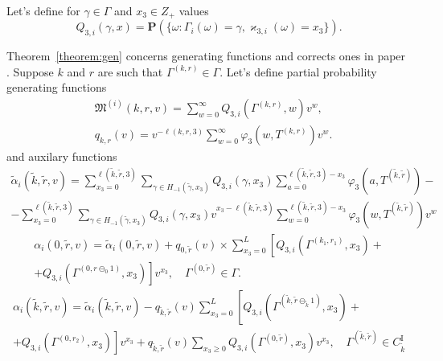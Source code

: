 \documentclass[60x84/16,10pt]{dccn}
\begin{document}
{Let's define for $\gamma \in \Gamma$ and $x_3 \in Z_+$ values
\begin{equation*}
Q_{3,i}(\gamma,x) = {\mathbf P}(\{\omega\colon \Gamma_{i}(\omega)=\gamma, \varkappa_{3,i}(\omega)=x_3\}).
\end{equation*}

Theorem~\ref{theorem:gen} concerns generating functions and corrects ones in paper \cite{k:z:2016}. Suppose $k$ and $r$ are such that $\Gamma^{(k,r)}\in \Gamma$. Let's define  partial probability generating functions 
\begin{align*}
&\mathfrak{M}^{(i)}(k,r,v) = \sum_{w=0}^{\infty} Q_{3,i}(\Gamma^{(k,r)},w) v^w,\\
&q_{k,r}(v) = v^{-\ell(k,r,3)}\sum_{w=0}^{\infty} \varphi_3(w,T^{(k,r)})v^w.
\end{align*}
and auxilary functions
\begin{multline*}
\tilde{\alpha}_i(\tilde{k},\tilde{r},v) = \sum_{x_3=0}^{\ell(\tilde{k},\tilde{r},3)}\sum_{\gamma \in H_{-1}(\tilde{\gamma},x_3)} Q_{3,i}(\gamma,x_3) \sum_{a=0}^{\ell(\tilde{k},\tilde{r},3) - x_3} \varphi_3(a,T^{(\tilde{k},\tilde{r})}) - \\
- \sum_{x_3=0}^{\ell(\tilde{k},\tilde{r},3)}  \sum_{\gamma \in H_{-1}(\tilde{\gamma},x_3)} Q_{3,i}(\gamma,x_3) v^{x_3-\ell(\tilde{k},\tilde{r},3)}  \sum_{w=0}^{\ell(\tilde{k},\tilde{r},3) -x_3}
\varphi_3(w,T^{(\tilde{k},\tilde{r})}) v^w
\end{multline*}
\begin{multline*}
\alpha_i(0,\tilde{r},v) =\tilde{\alpha}_i(0,\tilde{r},v) + q_{0,\tilde{r}}(v) \times \sum_{x_3=0}^{L} \left[ Q_{3,i}(\Gamma^{(k_1,r_1)},x_3) +\right. \\
\left. + Q_{3,i}(\Gamma^{(0,r\ominus_0 1)},x_3) \right] v^{x_3}, \quad \Gamma^{(0,\tilde{r})} \in \Gamma.
\end{multline*}
\begin{multline*}
\alpha_i(\tilde{k},\tilde{r},v) =\tilde{\alpha}_i(\tilde{k},\tilde{r},v) - q_{\tilde{k},\tilde{r}}(v)\sum_{x_3=0}^{L} \left[ Q_{3,i}(\Gamma^{(\tilde{k},\tilde{r}\ominus_{\tilde{k}} 1)},x_3) \right. + \\ +\left.  Q_{3,i}(\Gamma^{(0,r_2)},x_3) \right] v^{x_3}
+ q_{\tilde{k},\tilde{r}}(v)\sum_{x_3 \geqslant 0} Q_{3,i}(\Gamma^{(0,\tilde{r})},x_3)v^{x_3}, \quad \Gamma^{(\tilde{k}, \tilde{r})} \in C_{\tilde{k}}^{\mathrm{I}}

\end{multline*}}
\end{document}
